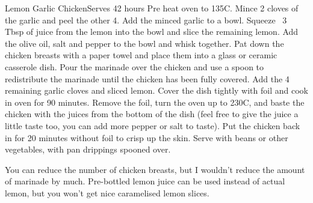 \begin{recipe}{Lemon Garlic Chicken}{Serves 4}{2 hours}
Pre heat oven to 135\degrees C. Mince 2 cloves of the garlic and peel the other 4. 
Add the minced garlic to a bowl. Squeeze ~3 Tbsp of juice from the
lemon into the bowl and slice the remaining lemon. Add the olive oil,
salt and pepper to the bowl and whisk together.
Pat down the chicken breasts with a paper towel and place them into
a glass or ceramic casserole dish. Pour the marinade over the chicken
and use a spoon to redistribute the marinade until the chicken has been
fully covered. Add the 4 remaining garlic cloves and sliced lemon. 
Cover the dish tightly with foil and cook in oven for 90 minutes. 
\newstep Remove the foil, turn the oven up to 230C, and baste
the chicken with the juices from the bottom of the dish (feel free to
give the juice a little taste too, you can add more pepper or salt 
to taste). Put the chicken back in for 20 minutes without foil
to crisp up the skin.
\newstep Serve with beans or other vegetables, with pan drippings spooned over.

\newstep You can reduce the number of chicken breasts, but I wouldn't reduce
the amount of marinade by much. Pre-bottled lemon juice can be used
instead of actual lemon, but you won't get nice caramelised lemon slices.
\end{recipe}